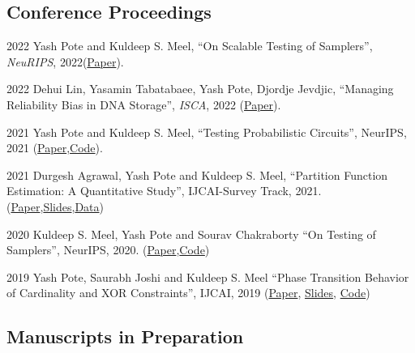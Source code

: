\documentclass[12pt,letterpaper]{report}
\begin{document}
    \subsection*{Conference Proceedings}

    \begin{tablist}       
   
    	
    	\item[2022] \tab  Yash Pote  and Kuldeep S. Meel, \enquote{On Scalable Testing of Samplers},  \textit{NeuRIPS},  2022(\href{https://openreview.net/pdf?id=qHs3qeaQjgl}{Paper}).
    		
    	\item[2022] \tab  Dehui Lin, Yasamin Tabatabaee, Yash Pote, Djordje Jevdjic, \enquote{Managing Reliability Bias in DNA Storage}, \textit{ISCA},  2022 (\href{https://dl.acm.org/doi/pdf/10.1145/3470496.3527441}{Paper}).
    				
    	\item[2021] \tab  Yash Pote  and Kuldeep S. Meel, \enquote{Testing Probabilistic Circuits},  {NeurIPS},  2021 (\href{https://www.comp.nus.edu.sg/~meel/Papers/neurips21-pm.pdf}{Paper},\href{https://github.com/meelgroup/teq}{Code}).
    	
    	\item[2021] \tab  Durgesh Agrawal, Yash Pote  and Kuldeep S. Meel, \enquote{Partition Function Estimation: A Quantitative Study}, IJCAI-Survey Track,  2021.(\href{https://arxiv.org/abs/2105.11132}{Paper},\href{https://meelgroup.github.io/publication/ijcai21_partition}{Slides},\href{https://doi.org/10.5281/zenodo.4769117}{Data})
    	
    	\item[2020] \tab Kuldeep S. Meel, Yash Pote  and Sourav Chakraborty \enquote{On Testing of Samplers}, NeurIPS, 2020. (\href{https://arxiv.org/abs/2010.12918}{Paper},\href{https://github.com/meelgroup/barbarik}{Code})
    	
    	
        \item[2019] \tab Yash Pote, Saurabh Joshi and Kuldeep S. Meel  \enquote{Phase Transition Behavior of Cardinality and
        XOR Constraints}, IJCAI, 2019 (\href{https://www.ijcai.org/proceedings/2019/0162.pdf}{Paper}, \href{https://meelgroup.github.io/files/slides/ijcai19pjm.pdf}{Slides}, \href{https://github.com/meelgroup/1-CARD-XOR/}{Code})
        

	
    \end{tablist}

    \subsection*{Manuscripts in Preparation}
\end{document}
